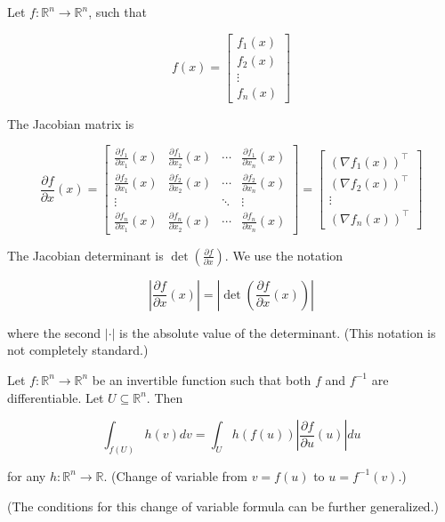 \documentclass{report}
\begin{document}
\begin{concept}
    Let $f: \mathbb{R}^{n} \rightarrow \mathbb{R}^{n}$, such that

    $$
    f(x)=\left[\begin{array}{c}
    f_{1}(x) \\
    f_{2}(x) \\
    \vdots \\
    f_{n}(x)
    \end{array}\right]
    $$

    The Jacobian matrix is

    $$
    \frac{\partial f}{\partial x}(x)=\left[\begin{array}{cccc}
    \frac{\partial f_{1}}{\partial x_{1}}(x) & \frac{\partial f_{1}}{\partial x_{2}}(x) & \cdots & \frac{\partial f_{1}}{\partial x_{n}}(x) \\
    \frac{\partial f_{2}}{\partial x_{1}}(x) & \frac{\partial f_{2}}{\partial x_{2}}(x) & \cdots & \frac{\partial f_{2}}{\partial x_{n}}(x) \\
    \vdots & & \ddots & \vdots \\
    \frac{\partial f_{n}}{\partial x_{1}}(x) & \frac{\partial f_{n}}{\partial x_{2}}(x) & \cdots & \frac{\partial f_{n}}{\partial x_{n}}(x)
    \end{array}\right]=\left[\begin{array}{c}
    \left(\nabla f_{1}(x)\right)^{\top} \\
    \left(\nabla f_{2}(x)\right)^{\top} \\
    \vdots \\
    \left(\nabla f_{n}(x)\right)^{\top}
    \end{array}\right]
    $$

    The Jacobian determinant is $\operatorname{det}\left(\frac{\partial f}{\partial x}\right)$. We use the notation

    $$
    \left|\frac{\partial f}{\partial x}(x)\right|=\left|\operatorname{det}\left(\frac{\partial f}{\partial x}(x)\right)\right|
    $$

    where the second $|\cdot|$ is the absolute value of the determinant. (This notation is not completely standard.)
\end{concept}

\begin{concept}
    Let $f: \mathbb{R}^{n} \rightarrow \mathbb{R}^{n}$ be an invertible function such that both $f$ and $f^{-1}$ are differentiable. Let $U \subseteq \mathbb{R}^{n}$. Then

    $$
    \int_{f(U)} h(v) d v=\int_{U} h(f(u))\left|\frac{\partial f}{\partial u}(u)\right| d u
    $$

    for any $h: \mathbb{R}^{n} \rightarrow \mathbb{R}$. (Change of variable from $v=f(u)$ to $u=f^{-1}(v)$.)

    (The conditions for this change of variable formula can be further generalized.)
\end{concept}
\end{document}
